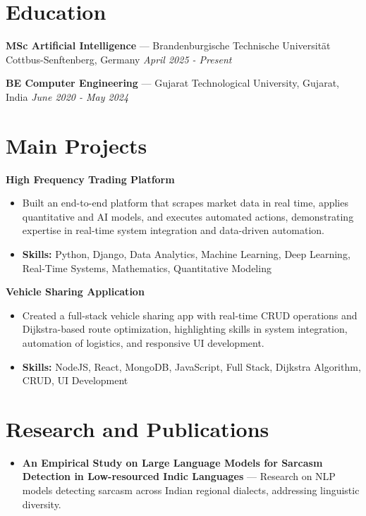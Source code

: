 \documentclass[a4paper,10pt]{article}
\begin{document}
\section*{Education}
\textbf{MSc Artificial Intelligence} — Brandenburgische Technische Universität Cottbus-Senftenberg, Germany \hfill \textit{April 2025 - Present}\par
\vspace{1.5pt}
\textbf{BE Computer Engineering} — Gujarat Technological University, Gujarat, India \hfill \textit{June 2020 - May 2024}\par

\section*{Main Projects}
\textbf{High Frequency Trading Platform}\par
\vspace{1pt}
\begin{itemize}
  \item Built an end-to-end platform that scrapes market data in real time, applies quantitative and AI models, and executes automated actions, demonstrating expertise in real-time system integration and data-driven automation.
  \item \textbf{Skills:} Python, Django, Data Analytics, Machine Learning, Deep Learning, Real-Time Systems, Mathematics, Quantitative Modeling
\end{itemize}
\vspace{3pt}
\textbf{Vehicle Sharing Application}\par
\vspace{1pt}
\begin{itemize}
  \item Created a full-stack vehicle sharing app with real-time CRUD operations and Dijkstra-based route optimization, highlighting skills in system integration, automation of logistics, and responsive UI development.
  \item \textbf{Skills:} NodeJS, React, MongoDB, JavaScript, Full Stack, Dijkstra Algorithm, CRUD, UI Development
\end{itemize}

\section*{Research and Publications}
\begin{itemize}
\item \textbf{An Empirical Study on Large Language Models for Sarcasm Detection in Low-resourced Indic Languages} — Research on NLP models detecting sarcasm across Indian regional dialects, addressing linguistic diversity.
\end{itemize}
\end{document}
